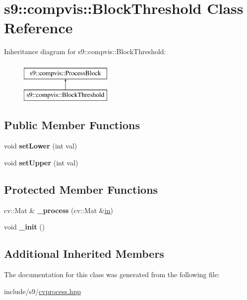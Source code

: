 \hypertarget{classs9_1_1compvis_1_1BlockThreshold}{\section{s9\-:\-:compvis\-:\-:Block\-Threshold Class Reference}
\label{classs9_1_1compvis_1_1BlockThreshold}
}
Inheritance diagram for s9\-:\-:compvis\-:\-:Block\-Threshold\-:\begin{figure}[H]
\begin{center}
\leavevmode
\includegraphics[height=2.000000cm]{classs9_1_1compvis_1_1BlockThreshold}
\end{center}
\end{figure}
\subsection*{Public Member Functions}
\begin{DoxyCompactItemize}
\item 
\hypertarget{classs9_1_1compvis_1_1BlockThreshold_a5351e7d65bb6cc9e0b4fb34e82e25fe7}{void {\bfseries set\-Lower} (int val)}\label{classs9_1_1compvis_1_1BlockThreshold_a5351e7d65bb6cc9e0b4fb34e82e25fe7}

\item 
\hypertarget{classs9_1_1compvis_1_1BlockThreshold_acc999ee27694a40272d1c3ce1f880c73}{void {\bfseries set\-Upper} (int val)}\label{classs9_1_1compvis_1_1BlockThreshold_acc999ee27694a40272d1c3ce1f880c73}

\end{DoxyCompactItemize}
\subsection*{Protected Member Functions}
\begin{DoxyCompactItemize}
\item 
\hypertarget{classs9_1_1compvis_1_1BlockThreshold_a8de7c478f270ad3e4a96034763b479bf}{cv\-::\-Mat \& {\bfseries \-\_\-process} (cv\-::\-Mat \&\hyperlink{structin}{in})}\label{classs9_1_1compvis_1_1BlockThreshold_a8de7c478f270ad3e4a96034763b479bf}

\item 
\hypertarget{classs9_1_1compvis_1_1BlockThreshold_a6827d75bf8fda3f7f7356f38103752b6}{void {\bfseries \-\_\-init} ()}\label{classs9_1_1compvis_1_1BlockThreshold_a6827d75bf8fda3f7f7356f38103752b6}

\end{DoxyCompactItemize}
\subsection*{Additional Inherited Members}


The documentation for this class was generated from the following file\-:\begin{DoxyCompactItemize}
\item 
include/s9/\hyperlink{cvprocess_8hpp}{cvprocess.\-hpp}\end{DoxyCompactItemize}
